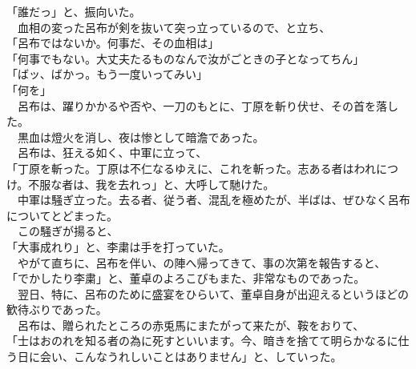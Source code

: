 \documentclass[
  paper=a5,
  fontsize=10pt,
  jafontsize=9.5pt,
  tate,                  %
  open_bracket_pos=nibu, %
]{jlreq}
\begin{document}
「誰だっ」と、振向いた。\\


　血相の変った呂布が剣を抜いて突っ立っているので、と立ち、\\


「呂布ではないか。何事だ、その血相は」\\


「何事でもない。大丈夫たるものなんで汝がごときの子となってちん」\\


「ばッ、ばかっ。もう一度いってみい」\\


「何を」\\


　呂布は、躍りかかるや否や、一刀のもとに、丁原を斬り伏せ、その首を落した。\\


　黒血は燈火を消し、夜は惨として暗澹であった。\\


　呂布は、狂える如く、中軍に立って、\\


「丁原を斬った。丁原は不仁なるゆえに、これを斬った。志ある者はわれにつけ。不服な者は、我を去れっ」と、大呼して馳けた。\\


　中軍は騒ぎ立った。去る者、従う者、混乱を極めたが、半ばは、ぜひなく呂布についてとどまった。\\


　この騒ぎが揚ると、\\


「大事成れり」と、李粛は手を打っていた。\\


　やがて直ちに、呂布を伴い、の陣へ帰ってきて、事の次第を報告すると、\\


「でかしたり李粛」と、董卓のよろこびもまた、非常なものであった。\\


　翌日、特に、呂布のために盛宴をひらいて、董卓自身が出迎えるというほどの歓待ぶりであった。\\


　呂布は、贈られたところの赤兎馬にまたがって来たが、鞍をおりて、\\


「士はおのれを知る者の為に死すといいます。今、暗きを捨てて明らかなるに仕う日に会い、こんなうれしいことはありません」と、していった。\\
\end{document}
